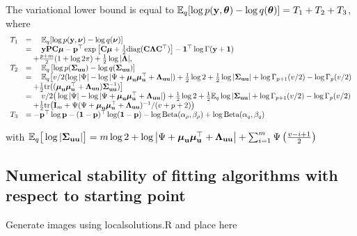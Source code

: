 \documentclass[times, doublespace]{anzsauth}
\newcommand{\mgc}[1]{{\color{blue}#1}}
\begin{document}
	The variational lower bound is equal to ${\mathbb E}_q[\log{p({\bf y}, {\boldsymbol\theta})} - \log{q({\boldsymbol\theta})}] = T_1 + T_2 + T_3$,
	where
	$$
	\begin{array}{rl}
		T_1 & = \quad {\mathbb E}_q[\log{p({\bf y}, {\boldsymbol\nu})} - \log{q({\boldsymbol\nu})}]                                                                                                                                                  \\
		    & = \quad {\bf y} {\bf P} {\bf C} {\boldsymbol\mu} - {\bf p}^\top \exp{\left[ {\bf C}{\boldsymbol\mu}+  \tfrac{1}{2} \text{diag} ({\bf C}{\boldsymbol\Lambda}{\bf C}^\top) \right]} - {\bf 1}^\top\log \Gamma{({\bf y}+ {\bf1})}                                               \\
		    & \quad + \frac{p + m}{2} (1 + \log{2 \pi}) + \tfrac{1}{2} \log{|{\boldsymbol\Lambda}|},                                                                                                                                \\
		T_2 & = \quad {\mathbb E}_q \left[ \log p({\boldsymbol \Sigma}_{{\bf u} {\bf u}}) - \log q({\boldsymbol \Sigma}_{{\bf u} {\bf u}}) \right]                                                                                                                 \\
		    & = \quad {\mathbb E}_q \big[ v/2(\log |\Psi| - \log |\Psi + {\boldsymbol \mu}_{\bf u} {\boldsymbol \mu}_{\bf u}^\top + {\boldsymbol \Lambda}_{{\bf u} {\bf u}}|) + \tfrac{1}{2} \log 2 + \tfrac{1}{2} \log|{\boldsymbol \Sigma}_{{\bf u} {\bf u}}| + \log \Gamma_{p+1}(v/2) - \log \Gamma_{p}(v/2)    \\
		    & \quad + \tfrac{1}{2} \text{tr}(({\boldsymbol \mu}_{{\bf u}} {\boldsymbol \mu}_{{\bf u}}^\top + {\boldsymbol \Lambda}_{{\bf u} {\bf u}}) {\boldsymbol \Sigma}_{{\bf u} {\bf u}}^{-1}) \big]                                                                                                  \\
		    & = \quad v/2\big(\log |\Psi| - \log |\Psi + {\boldsymbol \mu}_{\bf u} {\boldsymbol \mu}_{\bf u}^\top + {\boldsymbol \Lambda}_{{\bf u} {\bf u}}|\big) + \tfrac{1}{2} \log 2 + \tfrac{1}{2} {\mathbb E}_q \log |{\boldsymbol \Sigma}_{{\bf u} {\bf u}}| + \log \Gamma_{p+1}(v/2) - \log \Gamma_{p}(v/2) \\
		    & \quad + \tfrac{1}{2} \text{tr}\big({\bf I}_m + \Psi(\Psi+ {\boldsymbol \mu}_{\bf u} {\boldsymbol \mu}_{\bf u}^\top + {\boldsymbol \Lambda}_{{\bf u} {\bf u}})^{-1}/(v + p + 2)\big)                                                                                        \\
		T_3 & = - {\bf p}^\top \log {\bf p} - ({\bf 1} - {\bf p})^\top \log ({\bf 1} - {\bf p}) - \log \text{Beta} (\alpha_\rho, \beta_\rho) + \log \text{Beta} (\alpha_q, \beta_q)                                                              
	\end{array}
	$$
		
	\noindent with ${\mathbb E}_q \big[ \log |{\boldsymbol \Sigma}_{{\bf u} {\bf u}}| \big] = m \log 2 + \log \left | \Psi + {\boldsymbol \mu}_{\bf u} {\boldsymbol \mu}_{\bf u}^\top + {\boldsymbol \Lambda}_{{\bf u} {\bf u}} \right | + \sum_{i=1}^m \Psi \left ( \frac{v - i + 1}{2} \right )$
		
	\subsection{Numerical stability of fitting algorithms with respect to starting point}
		
	\mgc{Generate images using local\textunderscore solutions.R and place here}
		
	
	
		
\end{document}

